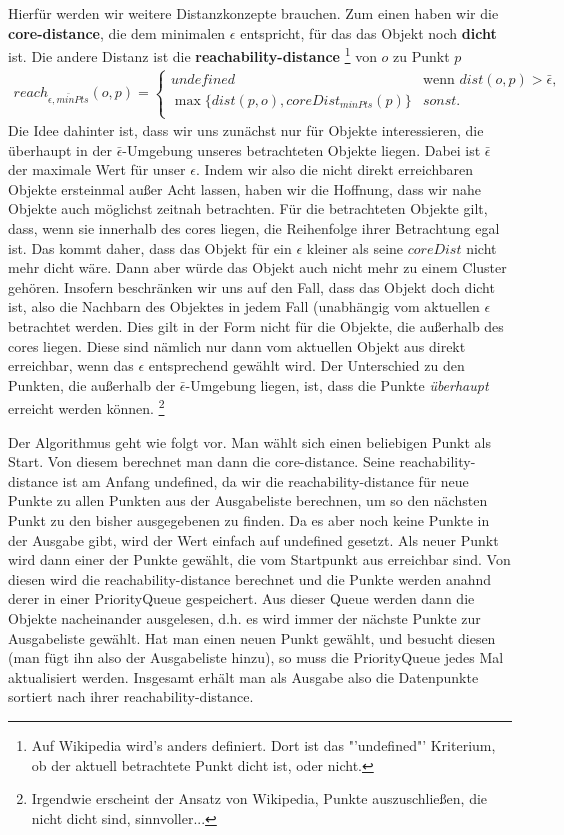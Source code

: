 Hierfür werden wir weitere Distanzkonzepte brauchen. Zum einen haben wir die
\textbf{core-distance}, die dem minimalen \(\epsilon\) entspricht,
für das das Objekt noch \textbf{dicht} ist. Die andere Distanz ist die
\textbf{reachability-distance}
\footnote{Auf Wikipedia wird's anders definiert. Dort ist das "'undefined"'
Kriterium, ob der aktuell betrachtete Punkt dicht ist, oder nicht.}
von \(o\) zu Punkt \(p\)
\begin{align*}
 reach_{\bar{\epsilon , minPts}}(o,p) = 
 \begin{cases}
 undefined & \text{wenn } dist(o,p) >\bar{\epsilon},\\
\max \{dist(p,o), coreDist_{minPts}(p)\} & sonst.\\
\end{cases}
\end{align*}
Die Idee dahinter ist, dass wir uns zunächst nur für Objekte interessieren,
die überhaupt in der \(\bar{\epsilon}\)-Umgebung unseres betrachteten
Objekte liegen. Dabei ist \(\bar{\epsilon}\) der maximale Wert für
unser \(\epsilon\). Indem wir also die nicht direkt erreichbaren Objekte
ersteinmal außer Acht lassen, haben wir die Hoffnung, dass wir nahe Objekte
auch möglichst zeitnah betrachten. Für die betrachteten Objekte gilt, dass,
wenn sie innerhalb des cores liegen, die Reihenfolge ihrer Betrachtung egal ist.
Das kommt daher, dass das Objekt für ein \(\epsilon\) kleiner als seine
\(coreDist\) nicht mehr dicht wäre. Dann aber würde das Objekt auch nicht
mehr zu einem Cluster gehören. Insofern beschränken wir uns auf den
Fall, dass das Objekt doch dicht ist, also die Nachbarn des Objektes in
jedem Fall (unabhängig vom aktuellen \(\epsilon\) betrachtet werden.
Dies gilt in der Form nicht für die Objekte, die außerhalb des cores liegen.
Diese sind nämlich nur dann vom aktuellen Objekt aus direkt erreichbar, wenn
das \(\epsilon\) entsprechend gewählt wird. Der Unterschied zu den Punkten,
die außerhalb der \(\bar{\epsilon}\)-Umgebung liegen, ist, dass die Punkte
\textit{überhaupt} erreicht werden können.
\footnote{Irgendwie erscheint der Ansatz von Wikipedia, Punkte auszuschließen,
die nicht dicht sind, sinnvoller...}

Der Algorithmus geht wie folgt vor. Man wählt sich einen beliebigen Punkt
als Start. Von diesem berechnet man dann die core-distance. Seine 
reachability-distance ist am Anfang undefined, da wir die reachability-distance
für neue Punkte zu allen Punkten aus der Ausgabeliste berechnen, um so den
nächsten Punkt zu den bisher ausgegebenen zu finden. Da es aber noch keine 
Punkte in der Ausgabe gibt, wird der Wert einfach auf undefined gesetzt.
Als neuer Punkt wird dann einer der Punkte gewählt, die vom Startpunkt
aus erreichbar sind. Von diesen wird die reachability-distance berechnet und die
Punkte werden anahnd derer in einer PriorityQueue gespeichert. Aus dieser
Queue werden dann die Objekte nacheinander ausgelesen, d.h. es wird immer
der nächste Punkte zur Ausgabeliste gewählt. Hat man einen neuen Punkt
gewählt, und besucht diesen (man fügt ihn also der Ausgabeliste hinzu), so
muss die PriorityQueue jedes Mal aktualisiert werden. Insgesamt erhält man
als Ausgabe also die Datenpunkte sortiert nach ihrer reachability-distance.

